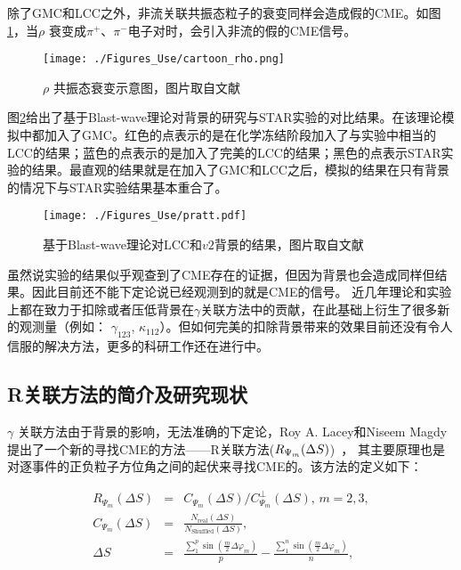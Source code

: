 除了GMC和LCC之外，非流关联共振态粒子的衰变同样会造成假的CME。如图\ref{fig:rhobackground}，当$\rho$ 衰变成$\pi^{+}$、$\pi^{-}$电子对时，会引入非流的假的CME信号。
\begin{figure}[htb]
\begin{center}
\texttt{[image: ./Figures\_Use/cartoon\_rho.png]}
\end{center}
\caption{$\rho$ 共振态衰变示意图，图片取自文献~\cite{Review3}}
\label{fig:rhobackground}
\end{figure}

图\ref{fig:Blass}给出了基于Blast-wave理论对背景的研究与STAR实验的对比结果。在该理论模拟中都加入了GMC。红色的点表示的是在化学冻结阶段加入了与实验中相当的LCC的结果；蓝色的点表示的是加入了完美的LCC的结果；黑色的点表示STAR实验的结果。最直观的结果就是在加入了GMC和LCC之后，模拟的结果在只有背景的情况下与STAR实验结果基本重合了。
\begin{figure}[htb]
\begin{center}
\texttt{[image: ./Figures\_Use/pratt.pdf]}
\end{center}
\caption{基于Blast-wave理论对LCC和$v2$背景的结果，图片取自文献~~\cite{Review3}}
\label{fig:Blass}
\end{figure}

虽然说实验的结果似乎观查到了CME存在的证据，但因为背景也会造成同样但结果。因此目前还不能下定论说已经观测到的就是CME的信号。
近几年理论和实验上都在致力于扣除或者压低背景在$\gamma$关联方法中的贡献，在此基础上衍生了很多新的观测量（例如： $\gamma_123$, $\kappa_{112} $）。但如何完美的扣除背景带来的效果目前还没有令人信服的解决方法，更多的科研工作还在进行中。



\subsection{ R关联方法的简介及研究现状}

$\gamma$ 关联方法由于背景的影响，无法准确的下定论，Roy A. Lacey和Niseem Magdy提出了一个新的寻找CME的方法——R关联方法($R_{{\rm \Psi}_m}(\Delta S)$)~\cite{RCorr-2011,RCorr-2018}， 其主要原理也是对逐事件的正负粒子方位角之间的起伏来寻找CME的。该方法的定义如下：

\begin{eqnarray}
R_{\Psi_m}(\Delta S) &=& C_{\Psi_m}(\Delta S)/C_{\Psi_m}^{\perp}(\Delta S),  \, m=2,3,  \nonumber \\
C_{\Psi_{m}}(\Delta S) &=&\frac{N_{\text{real}}(\Delta S)}{N_{\text{Shuffled}}(\Delta S)},  \nonumber \\
\Delta S &=& \frac{{\sum\limits_1^p {\sin (\frac{m}{2}\Delta {\varphi_{m} })} }}{p} - 
\frac{{\sum\limits_1^n {\sin (\frac{m}{2}\Delta {\varphi_{m}  })} }}{n},  \nonumber 
\end{eqnarray}


